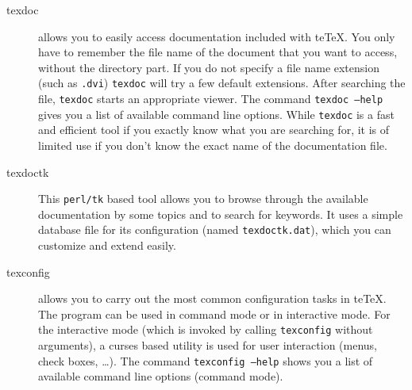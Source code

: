 \documentclass[11pt,a4paper]{article}
\newcommand{\teTeX}{\textrm{te}\TeX\xspace}
\begin{document}
\begin{description}
\item[texdoc] allows you to easily access documentation included with
  \teTeX. You only have to remember the file name of the document that
  you want to access, without the directory part. If you do not
  specify a file name extension (such as \texttt{.dvi})
  \texttt{texdoc} will try a few default extensions. After searching
  the file, \texttt{texdoc} starts an appropriate viewer.  The command
  \texttt{texdoc~--help} gives you a list of available command line
  options. While \texttt{texdoc} is a fast and efficient tool if you
  exactly know what you are searching for, it is of limited use if you
  don't know the exact name of the documentation file.
\item [texdoctk] This \texttt{perl/tk} based tool allows you to browse
  through the available documentation by some topics and to search for
  keywords. It uses a simple database file for its configuration
  (named \texttt{texdoctk.dat}), which you can customize and extend
  easily.
\item[texconfig] allows you to carry out the most common configuration
  tasks in \teTeX. The program can be used in command mode or in
  interactive mode. For the interactive mode (which is invoked by
  calling \texttt{texconfig} without arguments), a curses based
  utility is used for user interaction (menus, check boxes, \ldots).
  The command \texttt{texconfig --help} shows you a list of available
  command line options (command mode).
  

\end{description}
\end{document}
